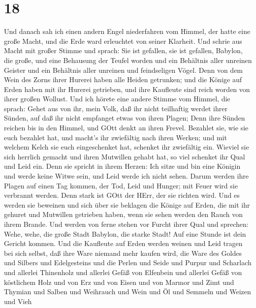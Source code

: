 \hypertarget{section-16}{%
\section{18}\label{section-16}}

 Und danach sah ich einen andern Engel niederfahren vom
Himmel, der hatte eine große Macht, und die Erde ward erleuchtet von
seiner Klarheit.  Und schrie aus Macht mit großer Stimme und
sprach: Sie ist gefallen, sie ist gefallen, Babylon, die große, und eine
Behausung der Teufel worden und ein Behältnis aller unreinen Geister und
ein Behältnis aller unreinen und feindseligen Vögel.  Denn
von dem Wein des Zorns ihrer Hurerei haben alle Heiden getrunken; und
die Könige auf Erden haben mit ihr Hurerei getrieben, und ihre Kaufleute
sind reich worden von ihrer großen Wollust.  Und ich hörete
eine andere Stimme vom Himmel, die sprach: Gehet aus von ihr, mein Volk,
daß ihr nicht teilhaftig werdet ihrer Sünden, auf daß ihr nicht
empfanget etwas von ihren Plagen;  Denn ihre Sünden reichen
bis in den Himmel, und GOtt denkt an ihren Frevel.  Bezahlet
sie, wie sie euch bezahlet hat, und macht's ihr zwiefältig nach ihren
Werken; und mit welchem Kelch sie euch eingeschenket hat, schenket ihr
zwiefältig ein.  Wieviel sie sich herrlich gemacht und ihren
Mutwillen gehabt hat, so viel schenket ihr Qual und Leid ein. Denn sie
spricht in ihrem Herzen: Ich sitze und bin eine Königin und werde keine
Witwe sein, und Leid werde ich nicht sehen.  Darum werden
ihre Plagen auf einen Tag kommen, der Tod, Leid und Hunger; mit Feuer
wird sie verbrannt werden. Denn stark ist GOtt der HErr, der sie richten
wird.  Und es werden sie beweinen und sich über sie beklagen
die Könige auf Erden, die mit ihr gehuret und Mutwillen getrieben haben,
wenn sie sehen werden den Rauch von ihrem Brande.  Und
werden von ferne stehen vor Furcht ihrer Qual und sprechen: Wehe, wehe,
die große Stadt Babylon, die starke Stadt! Auf eine Stunde ist dein
Gericht kommen.  Und die Kaufleute auf Erden werden weinen
und Leid tragen bei sich selbst, daß ihre Ware niemand mehr kaufen wird,
 die Ware des Goldes und Silbers und Edelgesteins und die
Perlen und Seide und Purpur und Scharlach und allerlei Thinenholz und
allerlei Gefäß von Elfenbein und allerlei Gefäß von köstlichem Holz und
von Erz und von Eisen und von Marmor  und Zimt und Thymian
und Salben und Weihrauch und Wein und Öl und Semmeln und Weizen und Vieh
